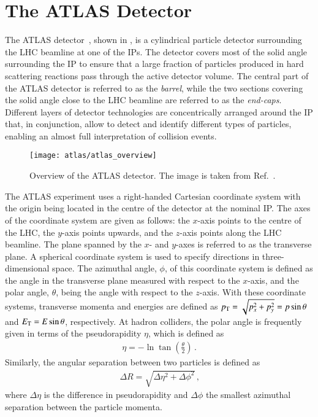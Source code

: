 \section{The ATLAS Detector}%
\label{sec:atlas}

The ATLAS detector~\cite{PERF-2007-01}, shown in
, is a cylindrical particle detector
surrounding the LHC beamline at one of the IPs. The detector covers most of the
solid angle surrounding the IP to ensure that a large fraction of particles
produced in hard scattering reactions pass through the active detector volume.
The central part of the ATLAS detector is referred to as the \emph{barrel},
while the two sections covering the solid angle close to the LHC beamline are
referred to as the \emph{end-caps}. Different layers of detector technologies
are concentrically arranged around the IP that, in conjunction, allow to detect
and identify different types of particles, enabling an almost full
interpretation of collision events.

\begin{figure}[htbp]
  \centering

  \texttt{[image: atlas/atlas\_overview]}

  \caption{Overview of the ATLAS detector. The image is taken from
    Ref.~\cite{PERF-2007-01}.}%
  \label{fig:atlas_detector_overview}
\end{figure}

The ATLAS experiment uses a right-handed Cartesian coordinate system with the
origin being located in the centre of the detector at the nominal IP. The axes
of the coordinate system are given as follows: the $x$-axis points to the centre
of the LHC, the $y$-axis points upwards, and the $z$-axis points along the LHC
beamline. The plane spanned by the $x$- and $y$-axes is referred to as the
transverse plane. A spherical coordinate system is used to specify directions in
three-dimensional space. The azimuthal angle, $\phi$, of this coordinate system
is defined as the angle in the transverse plane measured with respect to the
$x$-axis, and the polar angle, $\theta$, being the angle with respect to the
$z$-axis. With these coordinate systems, transverse momenta and energies are
defined as $p_{\text{T}} = \sqrt{p_x^2 + p_y^2} = p \sin\theta$ and $E_{\text{T}} = E \sin\theta$,
respectively. At hadron colliders, the polar angle is frequently given in terms
of the pseudorapidity $\eta$, which is defined as
\begin{align*}
  \eta = - \ln\tan\left( \frac{\theta}{2} \right) \,\text{.}
\end{align*}
Similarly, the angular separation between two particles is defined as
\begin{align*}
  \Delta R = \sqrt{\Delta \eta^2 + \Delta \phi^2} \,\text{,}
\end{align*}
where $\Delta \eta$ is the difference in pseudorapidity and $\Delta \phi$ the
smallest azimuthal separation between the particle momenta.

